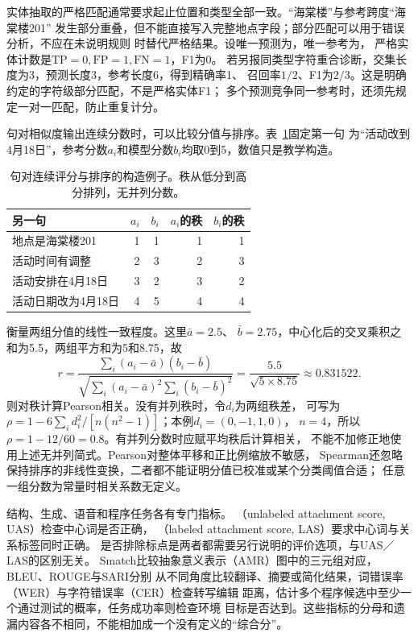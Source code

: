 实体抽取的严格匹配通常要求起止位置和类型全部一致。“海棠楼”与参考跨度“海棠楼201”
发生部分重叠，但不能直接写入完整地点字段；部分匹配可以用于错误分析，不应在未说明规则
时替代严格结果。设唯一预测为\code{LOC:[39,42)}，唯一参考为\code{LOC:[39,45)}，
严格实体计数是$\mathrm{TP}=0,\mathrm{FP}=1,\mathrm{FN}=1$，F1为0。
若另报同类型字符重合诊断，交集长度为3，预测长度3，参考长度6，得到精确率1、
召回率$1/2$、F1为$2/3$。这是明确约定的字符级部分匹配，不是严格实体F1；
多个预测竞争同一参考时，还须先规定一对一匹配，防止重复计分。

句对相似度输出连续分数时，可以比较分值与排序。表~\ref{tab:nlp-correlation}固定第一句
为“活动改到4月18日”，参考分数$a_i$和模型分数$b_i$均取0到5，数值只是教学构造。

\begin{table}[htbp]
 \centering
 \begin{tabularx}{\linewidth}{@{}Xrrrr@{}}
  \toprule
  另一句 & $a_i$ & $b_i$ & $a_i$的秩 & $b_i$的秩\\
  \midrule
  地点是海棠楼201 & 1 & 1 & 1 & 1\\
  活动时间有调整 & 2 & 3 & 2 & 3\\
  活动安排在4月18日 & 3 & 2 & 3 & 2\\
  活动日期改为4月18日 & 4 & 5 & 4 & 4\\
  \bottomrule
 \end{tabularx}
 \caption{句对连续评分与排序的构造例子。秩从低分到高分排列，无并列分数。}
 \label{tab:nlp-correlation}
\end{table}

衡量两组分值的线性一致程度。这里$\bar a=2.5$、
$\bar b=2.75$，中心化后的交叉乘积之和为5.5，两组平方和为5和8.75，故
\begin{equation}
 r=\frac{\sum_i(a_i-\bar a)(b_i-\bar b)}
 {\sqrt{\sum_i(a_i-\bar a)^2\sum_i(b_i-\bar b)^2}}
 =\frac{5.5}{\sqrt{5\times8.75}}\approx0.831522.
 \label{eq:nlp-pearson}
\end{equation}
则对秩计算Pearson相关。没有并列秩时，令$d_i$为两组秩差，
可写为$\rho=1-6\sum_i d_i^2/[n(n^2-1)]$；本例$d_i=(0,-1,1,0)$，
$n=4$，所以$\rho=1-12/60=0.8$。有并列分数时应赋平均秩后计算相关，
不能不加修正地使用上述无并列简式。Pearson对整体平移和正比例缩放不敏感，
Spearman还忽略保持排序的非线性变换，二者都不能证明分值已校准或某个分类阈值合适；
任意一组分数为常量时相关系数无定义。

结构、生成、语音和程序任务各有专门指标。
（unlabeled attachment score, UAS）检查中心词是否正确，
（labeled attachment score, LAS）要求中心词与关系标签同时正确。
是否排除标点是两者都需要另行说明的评价选项，与UAS／LAS的区别无关。
Smatch比较抽象意义表示（AMR）图中的三元组对应，BLEU、ROUGE与SARI分别
从不同角度比较翻译、摘要或简化结果，词错误率（WER）与字符错误率（CER）检查转写编辑
距离，估计多个程序候选中至少一个通过测试的概率，任务成功率则检查环境
目标是否达到。这些指标的分母和遗漏内容各不相同，不能相加成一个没有定义的“综合分”。

